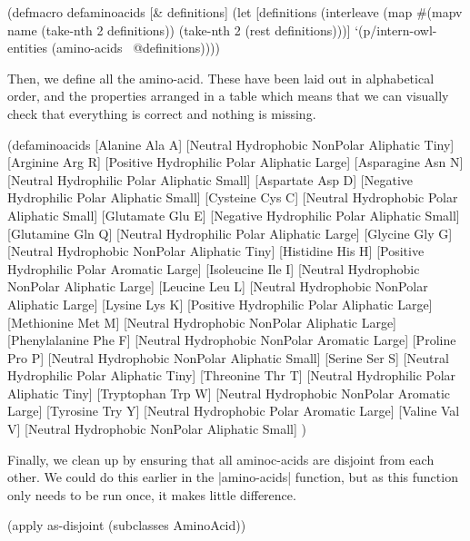 \begin{tawny}
(defmacro defaminoacids
  [& definitions]
  (let [definitions
        (interleave
         (map
          #(mapv name %
          (take-nth 2 definitions))
         (take-nth 2 (rest definitions)))]
    `(p/intern-owl-entities
      (amino-acids ~@definitions))))
\end{tawny}

Then, we define all the amino-acid. These have been laid out in
alphabetical order, and the properties arranged in a table which means that we
can visually check that everything is correct and nothing is missing.

\begin{tawny}
(defaminoacids
  [Alanine       Ala A] [Neutral  Hydrophobic NonPolar Aliphatic Tiny]
  [Arginine      Arg R] [Positive Hydrophilic Polar    Aliphatic Large]
  [Asparagine    Asn N] [Neutral  Hydrophilic Polar    Aliphatic Small]
  [Aspartate     Asp D] [Negative Hydrophilic Polar    Aliphatic Small]
  [Cysteine      Cys C] [Neutral  Hydrophobic Polar    Aliphatic Small]
  [Glutamate     Glu E] [Negative Hydrophilic Polar    Aliphatic Small]
  [Glutamine     Gln Q] [Neutral  Hydrophilic Polar    Aliphatic Large]
  [Glycine       Gly G] [Neutral  Hydrophobic NonPolar Aliphatic Tiny]
  [Histidine     His H] [Positive Hydrophilic Polar    Aromatic  Large]
  [Isoleucine    Ile I] [Neutral  Hydrophobic NonPolar Aliphatic Large]
  [Leucine       Leu L] [Neutral  Hydrophobic NonPolar Aliphatic Large]
  [Lysine        Lys K] [Positive Hydrophilic Polar    Aliphatic Large]
  [Methionine    Met M] [Neutral  Hydrophobic NonPolar Aliphatic Large]
  [Phenylalanine Phe F] [Neutral  Hydrophobic NonPolar Aromatic  Large]
  [Proline       Pro P] [Neutral  Hydrophobic NonPolar Aliphatic Small]
  [Serine        Ser S] [Neutral  Hydrophilic Polar    Aliphatic Tiny]
  [Threonine     Thr T] [Neutral  Hydrophilic Polar    Aliphatic Tiny]
  [Tryptophan    Trp W] [Neutral  Hydrophobic NonPolar Aromatic  Large]
  [Tyrosine      Try Y] [Neutral  Hydrophobic Polar    Aromatic  Large]
  [Valine        Val V] [Neutral  Hydrophobic NonPolar Aliphatic Small]
  )
\end{tawny}

Finally, we clean up by ensuring that all aminoc-acids are disjoint from each
other. We could do this earlier in the |amino-acids| function, but as this
function only needs to be run once, it makes little difference.

\begin{tawny}
(apply as-disjoint (subclasses AminoAcid))
\end{tawny}

